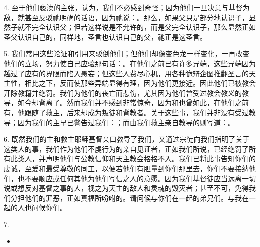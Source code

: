 4. 至于他们亵渎的主张，认为，我们不必感到奇怪；因为他们一旦决意与基督为敌，就甚至反驳祂明确的话语，因为祂说：。那么，如果父只是部分地认识子，显然子就不完全认识父；但若这样说是不允许的，而是父完全认识子，那么显然正如圣父认识自己的，同样地，圣言也认识自己的父，祂正是这圣言。\par

5. 我们常用这些论证和引用来驳倒他们；但他们却像变色龙一样变化，一再改变他们的立场，努力使自己应验那句话：。在他们之前已有许多异端，这些异端因为越过了应有的界限而陷入愚妄；但这些人费尽心机，用各种诡辩企图推翻圣言的天主性，相比之下，反而使那些异端显得有理，因为他们更接近。因此他们已被教会开除教籍并绝罚。我们为他们的丧亡而悲伤，尤其因为他们曾受过教会教义的教导，如今却背离了。然而我们并不感到非常惊奇，因为和也曾如此，在他们之前有，他跟随了救主，后来却成为叛徒和背教者。关于这些事，我们并非没有受过教导；因为我们的主早已警告过我们：；而由我们救主亲自教导的则写道：。\par

6. 既然我们的主和救主耶稣基督亲口教导了我们，又通过宗徒向我们指明了关于这类人的事，我们作为他们不虔行为的亲自见证者，正如我们所说，已经绝罚了所有此类人，并声明他们与公教信仰和天主教会格格不入。我们已将此事告知你们的虔诚，至爱和最受尊敬的同工，以便若他们有胆量到你们那里去，你们不要接纳他们，也不要顺应或任何其他为他们写信之人的意愿。因为我们基督徒应当远离一切说或想反对基督之事的人，视之为天主的敌人和灵魂的毁灭者；甚至不可，免得我们分担他们的罪恶，正如真福所吩咐的。请问候与你们在一起的弟兄们。与我在一起的人也问候你们。\par

\par

7. \par

\begin{itemize}
\item {}
\end{itemize}

